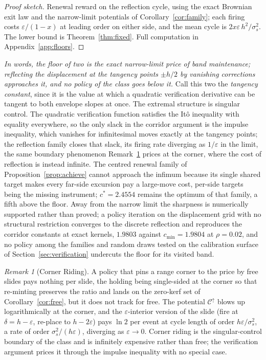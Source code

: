 \documentclass[11pt,a4paper]{article}
\theoremstyle{definition}
\theoremstyle{plain}
\theoremstyle{remark}
\newtheorem{remark}{Remark}
\begin{document}
\begin{proof}[Proof sketch]
Renewal reward on the reflection cycle, using the exact Brownian exit law and the narrow-limit potentials of Corollary~\ref{cor:family}; each firing costs $\varepsilon/(1 - x)$
at leading order on either side, and the mean cycle is $2 x \varepsilon\, h^2/\sigma_s^2$. The lower bound is Theorem~\ref{thm:fixed}. Full computation in Appendix~\ref{app:floors}.
\end{proof}

\emph{In words, the floor of two is the exact narrow-limit price of band maintenance; reflecting the displacement at the tangency points $\pm h/2$ by vanishing corrections approaches it, 
and no policy of the class goes below it.} Call this two the \emph{tangency constant}, since it is the value at which a quadratic verification derivative can be tangent to both envelope 
slopes at once. The extremal structure is singular control. The quadratic verification function satisfies the It\^o inequality with equality everywhere, so the only slack in the corridor 
argument is the impulse inequality, which vanishes for infinitesimal moves exactly at the tangency points; the reflection family closes that slack, its firing rate diverging as $1/\varepsilon$ 
in the limit, the same boundary phenomenon Remark~\ref{rem:corner} prices at the corner, where the cost of reflection is instead infinite. The centred renewal family of Proposition~\ref{prop:achieve} 
cannot approach the infimum because its single shared target makes every far-side excursion pay a large-move cost, per-side targets being the missing instrument; $c^* = 2.4554$ remains the optimum 
of that family, a fifth above the floor. Away from the narrow limit the sharpness is numerically supported rather than proved; a policy iteration on the displacement grid with no structural 
restriction converges to the discrete reflection and reproduces the corridor constants at exact kernels, $1.9803$ against $c_{\min} = 1.9804$ at $\rho = 0.02$, and no policy among the families 
and random draws tested on the calibration surface of Section~\ref{sec:verification} undercuts the floor for its visited band.

\begin{remark}[Corner Riding]\label{rem:corner}
A policy that pins a range corner to the price by free slides pays nothing per slide, the holding being single-sided at the corner so that re-minting preserves the ratio and lands on the 
zero-kerf set of Corollary~\ref{cor:free}, but it does not track for free. The potential $\mathcal{C}^{\uparrow}$ blows up logarithmically at the corner, and the $\varepsilon$-interior version 
of the slide (fire at $\delta = h - \varepsilon$, re-place to $h - 2\varepsilon$) pays $\ln 2$ per event at cycle length of order $h\varepsilon/\sigma_s^2$, a rate of order $\sigma_s^2/(h\varepsilon)$, 
diverging as $\varepsilon \to 0$. Corner riding is the singular-control boundary of the class and is infinitely expensive rather than free; the verification argument prices it through the impulse 
inequality with no special case.
\end{remark}
\end{document}
